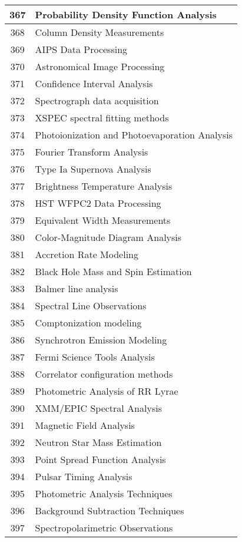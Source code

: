 \begin{table}[htbp]
\begin{tabular}{|c|l|}
\hline
367 & Probability Density Function Analysis \\
\hline
368 & Column Density Measurements \\
\hline
369 & AIPS Data Processing \\
\hline
370 & Astronomical Image Processing \\
\hline
371 & Confidence Interval Analysis \\
\hline
372 & Spectrograph data acquisition \\
\hline
373 & XSPEC spectral fitting methods \\
\hline
374 & Photoionization and Photoevaporation Analysis \\
\hline
375 & Fourier Transform Analysis \\
\hline
376 & Type Ia Supernova Analysis \\
\hline
377 & Brightness Temperature Analysis \\
\hline
378 & HST WFPC2 Data Processing \\
\hline
379 & Equivalent Width Measurements \\
\hline
380 & Color-Magnitude Diagram Analysis \\
\hline
381 & Accretion Rate Modeling \\
\hline
382 & Black Hole Mass and Spin Estimation \\
\hline
383 & Balmer line analysis \\
\hline
384 & Spectral Line Observations \\
\hline
385 & Comptonization modeling \\
\hline
386 & Synchrotron Emission Modeling \\
\hline
387 & Fermi Science Tools Analysis \\
\hline
388 & Correlator configuration methods \\
\hline
389 & Photometric Analysis of RR Lyrae \\
\hline
390 & XMM/EPIC Spectral Analysis \\
\hline
391 & Magnetic Field Analysis \\
\hline
392 & Neutron Star Mass Estimation \\
\hline
393 & Point Spread Function Analysis \\
\hline
394 & Pulsar Timing Analysis \\
\hline
395 & Photometric Analysis Techniques \\
\hline
396 & Background Subtraction Techniques \\
\hline
397 & Spectropolarimetric Observations \\

\end{tabular}
\end{table}
